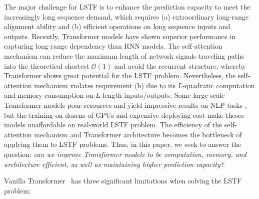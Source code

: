 \documentclass[letterpaper]{article} %
\newcommand{\bigO}{\mathcal{O}}
\begin{document}
The major challenge for LSTF is to enhance the prediction capacity to meet the increasingly long sequence demand, which requires (a) extraordinary long-range alignment ability and (b) efficient operations on long sequence inputs and outputs.
Recently, Transformer models have shown superior performance in capturing long-range dependency than RNN models. The self-attention mechanism can reduce the maximum length of network signals traveling paths into the theoretical shortest $\bigO(1)$ and avoid the recurrent structure, whereby Transformer shows great potential for the LSTF problem.
Nevertheless, the self-attention mechanism violates requirement (b) due to its $L$-quadratic computation and memory consumption on $L$-length inputs/outputs. Some large-scale Transformer models pour resources and yield impressive results on NLP tasks \cite{DBLP:journals/corr/abs-2005-14165}, but the training on dozens of GPUs and expensive deploying cost make theses models unaffordable on real-world LSTF problem. The efficiency of the self-attention mechanism and Transformer architecture becomes the bottleneck of applying them to LSTF problems.
Thus, in this paper, we seek to answer the question: \emph{can we improve Transformer models to be computation, memory, and architecture efficient, as well as maintaining higher prediction capacity?}

Vanilla Transformer~\cite{vaswani2017attention} has three significant limitations when solving the LSTF problem:
\end{document}
